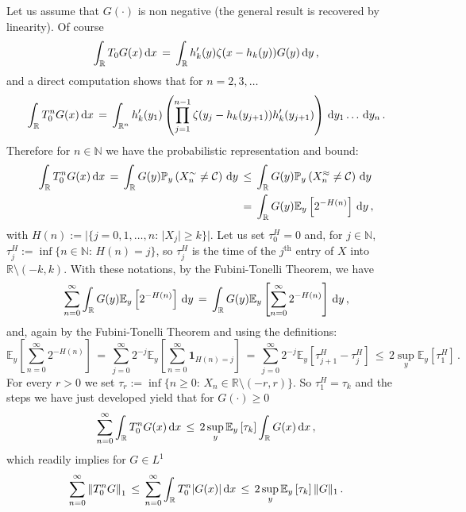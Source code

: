 \documentclass[reqno,11pt]{amsart}
\numberwithin{equation}{section}
\newcommand{\ind}{\mathbf{1}}
\newcommand{\cC}{{\ensuremath{\mathcal C}} }
\newcommand{\dd}{\,\text{\rm d}}             %
\newcommand{\bbE}{{\ensuremath{\mathbb E}} }
\newcommand{\bbN}{{\ensuremath{\mathbb N}} }
\newcommand{\bbP}{{\ensuremath{\mathbb P}} }
\newcommand{\bbR}{{\ensuremath{\mathbb R}} }
\newcommand{\gz}{\zeta}
\begin{document}
Let us assume  that $G(\cdot)$ is non negative (the general result is recovered by linearity).
Of course
\begin{equation}
\int_\bbR T_0G(x) \dd x \, =\, \int_{\bbR} h'_k(y) \gz(x-h_k(y)) G(y) \dd y\, ,
\end{equation}
and a  direct computation shows that for $n=2,3, \ldots$
\begin{equation}
\int_\bbR  T_0^n G(x) \dd x \, =\, \int_{\bbR^n} h_k'(y_1) 
\left(
\prod_{j=1}^{n-1} \gz(y_j-h_k(y_{j+1}))  h'_k (y_{j+1})\right)
\dd y_1 \ldots \dd y_n\, .
\end{equation}
Therefore for $n\in \bbN$ we have the probabilistic representation and bound:
\begin{equation}
\begin{split}
\int_\bbR  T_0^n G(x) \dd x \, =\,
\int_\bbR G(y)\bbP_y\left( X^{\sim}_n\not= \cC \right) \dd y \, &\le \, 
\int_\bbR G(y)\bbP_y\left( X^{\approx}_n\not= \cC \right) \dd y
\\
&=\, \int_\bbR G(y)\bbE_y\left[ 2^{-H(n)} \right] \dd y\, ,
\end{split}
\end{equation}
with $H(n):=\vert \{j=0,1, \ldots, n:\, \vert X_j\vert \ge k \}\vert$. Let us set $\tau^H_0=0$ and, for $j \in \bbN$,
$\tau^H_j:= \inf \{ n \in \bbN: \, H(n)=j\}$, so $\tau^H_j$ is the time of the $j^{\textrm{th}}$ entry of $X$
into $\bbR \setminus (-k,k)$. With these notations, by the Fubini-Tonelli Theorem, we have
\begin{equation}
\sum_{n =0}^\infty
\int_\bbR G(y)\bbE_y\left[ 2^{-H(n)} \right] \dd y \, =\, 
\int_\bbR G(y)
\bbE_y\left[  \sum_{n =0}^\infty2^{-H(n)} \right]  \dd y \, ,
\end{equation}
and, again  by the Fubini-Tonelli Theorem and using the definitions:
\begin{equation}
\bbE_y\left[  \sum_{n =0}^\infty2^{-H(n)} \right]\, =\, 
\sum_{j=0}^\infty 2^{-j}
\bbE_y\left[  \sum_{n =0}^\infty
\ind_{H(n)=j} \right]\, =\, \sum_{j=0}^\infty 2^{-j} \bbE_y\left[ \tau^H_{j+1}-  \tau^H_{j}\right]\, \le \, 
2 \sup_y  \bbE_y\left[ \tau^H_1\right]\,.
\end{equation}
For every $r>0$ we set $\tau_r:= \inf\{n\ge 0:\, X_n \in \bbR \setminus (-r,r)\}$.
So  $\tau^H_1=\tau_k$ and the steps we have just developed yield that for $G(\cdot)\ge 0$
\begin{equation}
\sum_{n=0}^\infty
\int_\bbR  T_0^n G(x) \dd x \, \le \, 2  \sup_y  \bbE_y\left[ \tau_k\right] \int_\bbR   G(x) \dd x \, ,
\end{equation}
which readily implies for $G \in L^1$
\begin{equation}
\label{eq:tbuwlemTk}
\sum_{n=0}^\infty
\left\Vert T_0^n G \right\Vert_1\, \le \, \sum_{n=0}^\infty
\int_\bbR  T_0^n \vert G(x)\vert \dd x \, \le \, 2  \sup_y  \bbE_y\left[ \tau_k\right] \Vert G \Vert_1 \, .
\end{equation}
\end{document}
